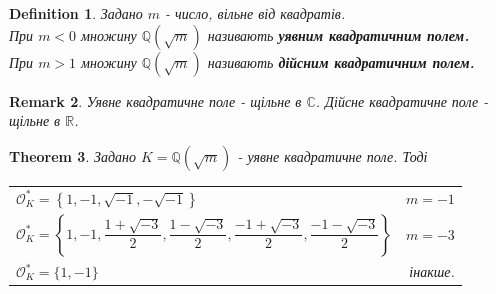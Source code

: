 \documentclass[a4paper, 10pt]{article}
\theoremstyle{theoremdd}
\newtheorem{theorem}{Theorem}[subsection]
\theoremstyle{theoremdd}
\newtheorem{definition}[theorem]{Definition}
\theoremstyle{theoremdd}
\theoremstyle{theoremdd}
\theoremstyle{theoremdd}
\theoremstyle{theoremdd}
\newtheorem{remark}[theorem]{Remark}
\theoremstyle{theoremdd}
\theoremstyle{theoremdd}
\begin{document}
\begin{definition}
Задано $m$ - число, вільне від квадратів.\\
При $m < 0$ множину $\mathbb{Q}(\sqrt{m})$ називають \textbf{уявним квадратичним полем.}\\
При $m > 1$ множину $\mathbb{Q}(\sqrt{m})$ називають \textbf{дійсним квадратичним полем.}
\end{definition}

\begin{remark}
Уявне квадратичне поле - щільне в $\mathbb{C}$. Дійсне квадратичне поле - щільне в $\mathbb{R}$.
\end{remark}

\begin{theorem}
Задано $K = \mathbb{Q}(\sqrt{m})$ - уявне квадратичне поле. Тоді
\begin{tabular}{lr}
$\mathcal{O}^*_K = \left\{ 1,-1,\sqrt{-1},-\sqrt{-1} \right\}$ & $m = -1$\\
$\mathcal{O}^*_K = \left\{ 1,-1,\dfrac{1+\sqrt{-3}}{2},\dfrac{1-\sqrt{-3}}{2},\dfrac{-1+\sqrt{-3}}{2}, \dfrac{-1-\sqrt{-3}}{2} \right\}$ & $m = -3$\\
$\mathcal{O}^*_K = \{1,-1\}$ & інакше.
\end{tabular}
\end{theorem}
\end{document}
